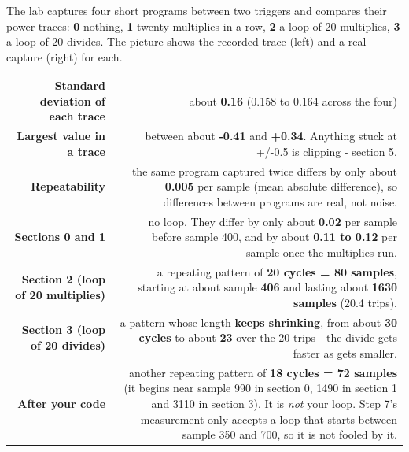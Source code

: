 \documentclass[11pt,letterpaper]{article}
\begin{document}
\Needspace{446pt}


The lab captures four short programs between two triggers and compares their power traces: \textbf{0} nothing,
\textbf{1} twenty multiplies in a row, \textbf{2} a loop of 20 multiplies, \textbf{3} a loop of 20 divides. The
picture shows the recorded trace (left) and a real capture (right) for each.


{\small{}
\begin{longtable}{|R{0.3623}|R{0.6377}|}
\hline
{} &  \\ \hline
\endhead
\textbf{Standard deviation of each trace} & about \textbf{0.16} (0.158 to 0.164 across the four) \\ \hline
\textbf{Largest value in a trace} & between about \textbf{-0.41} and \textbf{+0.34}. Anything stuck at +/-0.5 is clipping - section 5. \\ \hline
\textbf{Repeatability} & the same program captured twice differs by only about \textbf{0.005} per sample (mean absolute difference), so differences between programs are real, not noise. \\ \hline
\textbf{Sections 0 and 1} & no loop. They differ by only about \textbf{0.02} per sample before sample 400, and by about \textbf{0.11 to 0.12} per sample once the multiplies run. \\ \hline
\textbf{Section 2 (loop of 20 multiplies)} & a repeating pattern of \textbf{20 cycles = 80 samples}, starting at about sample \textbf{406} and lasting about \textbf{1630 samples} (20.4 trips). \\ \hline
\textbf{Section 3 (loop of 20 divides)} & a pattern whose length \textbf{keeps shrinking}, from about \textbf{30 cycles} to about \textbf{23} over the 20 trips - the divide gets faster as  gets smaller. \\ \hline
\textbf{After your code} & another repeating pattern of \textbf{18 cycles = 72 samples} (it begins near sample 990 in section 0, 1490 in section 1 and 3110 in section 3). It is \emph{not} your loop. Step 7's measurement only accepts a loop that starts between sample 350 and 700, so it is not fooled by it. \\ \hline
\end{longtable}}
\end{document}
